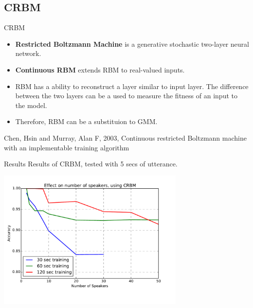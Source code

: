 

\subsection{CRBM}

\begin{frame}{CRBM}
  \begin{itemize}
    \item \textbf{Restricted Boltzmann Machine} is a generative stochastic two-layer neural network.

    \item \textbf{Continuous RBM} extends RBM to real-valued inputs.
      \pause
    \item RBM has a ability to reconstruct a layer similar to input layer.
      The difference between the two layers can be a used to measure the fitness of an input to the model.

    \item Therefore, RBM can be a substituion to GMM.
  \end{itemize}


  \begin{reference}{4mm}{85mm}
Chen, Hsin and Murray, Alan F, 2003,
Continuous restricted Boltzmann machine with an implementable training algorithm
  \end{reference}
\end{frame}

\begin{frame}{Results}
  Results of CRBM, tested with 5 secs
  of utterance.
  \begin{center}
    \includegraphics[width=0.7\textwidth]{res/crbm.pdf}
  \end{center}
\end{frame}

